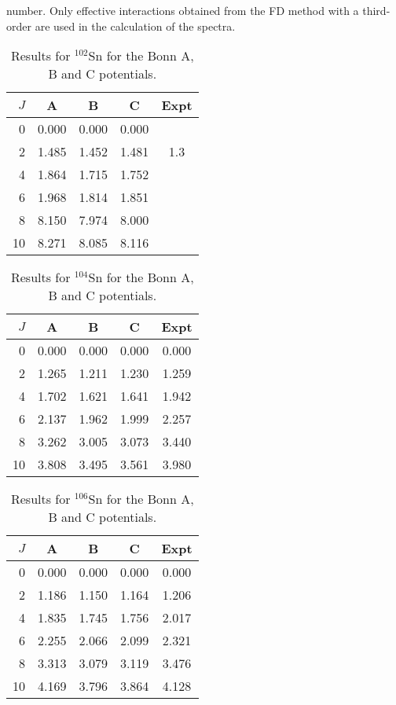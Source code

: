 number. Only effective interactions obtained
from the FD method with a third-order
\qbox are used  in the calculation of the spectra.
\begin{table}[hbpt]
\caption{Results for $^{102}$Sn for the Bonn A, B and C
potentials.}\label{tab:sn102}
\begin{center}
\begin{tabular}{rcccc}
\\\hline
$J$& A& B
& C & Expt \\[1ex]
\hline
0 & 0.000   & 0.000   & 0.000&\\
 2 &1.485  &1.452  &1.481 &1.3\\
 4 &1.864  &1.715  &1.752 &\\
 6 &1.968  &1.814  &1.851 &\\
 8 &8.150  &7.974  &8.000 &\\
 10&8.271  &8.085  &8.116 &\\
\hline
\end{tabular}
\end{center}
\end{table}
\begin{table}[hbpt]
\caption{Results for $^{104}$Sn for the Bonn A, B and C
potentials.}\label{tab:sn104}
\begin{center}
\begin{tabular}{rcccc}
\\\hline
$J$& A& B
& C & Expt \\[1ex]
\hline
0 & 0.000   & 0.000   & 0.000&0.000\\
 2 & 1.265 & 1.211 &1.230 &1.259\\
 4 & 1.702 & 1.621 &1.641 &1.942\\
 6 & 2.137 & 1.962 &1.999 &2.257\\
 8 & 3.262 & 3.005 &3.073 &3.440\\
 10& 3.808 & 3.495 &3.561 &3.980\\
\hline
\end{tabular}
\end{center}
\end{table}
\begin{table}[hbpt]
\caption{Results for $^{106}$Sn for the Bonn A, B and C
potentials.}\label{tab:sn106}
\begin{center}
\begin{tabular}{rcccc}
\\\hline
$J$& A& B
& C & Expt \\[1ex]
\hline
0 & 0.000   & 0.000   & 0.000&0.000\\
 2 & 1.186 &1.150  &1.164 &1.206\\
 4 & 1.835 &1.745  &1.756 &2.017\\
 6 & 2.255 &2.066  &2.099 &2.321\\
 8 & 3.313 &3.079  &3.119 &3.476\\
 10& 4.169 &3.796  &3.864 &4.128\\
\hline
\end{tabular}
\end{center}
\end{table}
